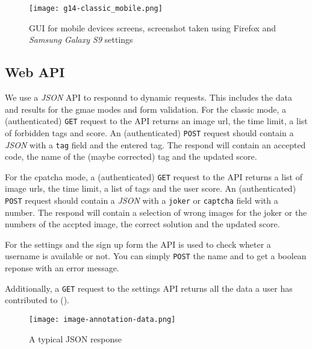 \begin{figure}[!]
\centering
\texttt{[image: g14-classic\_mobile.png]}
\caption{GUI for mobile devices screens, screenshot taken using Firefox and \textit{Samsung Galaxy S9} settings}
\label{g14:fig:guiclassicmobile}
\end{figure}


\subsection{Web API}
\label{g14:sec:implementation:API}
We use a \textit{JSON} API to responnd to dynamic requests. This includes the data and results for the gmae modes and form validation.
For the classic mode, a (authenticated) \texttt{GET} request to the API returns an image url, the time limit, a list of forbidden tags and score.
An (authenticated) \texttt{POST} request should contain a \textit{JSON} with a \texttt{tag} field and the entered tag. The respond will contain an accepted code, the name of the (maybe corrected) tag and the updated score.

For the cpatcha mode, a (authenticated) \texttt{GET} request to the API returns a list of image urls, the time limit, a list of tags and the user score.
An (authenticated) \texttt{POST} request should contain a \textit{JSON} with a \texttt{joker} or \texttt{captcha} field with a number. The respond will contain a selection of wrong images for the joker or the numbers of the accpted image, the correct solution and the updated score.

For the settings and the sign up form the API is used to check wheter a username is available or not. You can simply \texttt{POST} the name and to get a boolean reponse with an error message.

Additionally, a \texttt{GET} request to the settings API returns all the data a user has contributed to ().

\begin{figure}[!]
\centering
\texttt{[image: image-annotation-data.png]}
\caption{A typical JSON response}
\label{g14:fig:webapi}
\end{figure}
